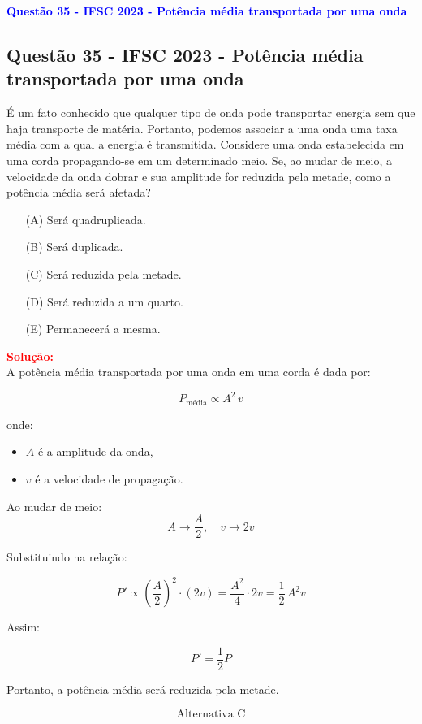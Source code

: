 \begin{flushleft}
\textbf{\textcolor{blue}{\Large Quest\~ao 35 - IFSC 2023 - Potência média transportada por uma onda}}\\
\noindent

\subsection{Quest\~ao 35 - IFSC 2023 - Potência média transportada por uma onda}
É um fato conhecido que qualquer tipo de onda pode transportar energia sem que haja transporte de matéria. 
Portanto, podemos associar a uma onda uma taxa média com a qual a energia é transmitida. Considere uma onda 
estabelecida em uma corda propagando-se em um determinado meio. Se, ao mudar de meio, a velocidade da onda dobrar 
e sua amplitude for reduzida pela metade, como a potência média será afetada?

\begin{itemize}
\item[(A)] Será quadruplicada.
\item[(B)] Será duplicada.
\item[(C)] Será reduzida pela metade.
\item[(D)] Será reduzida a um quarto.
\item[(E)] Permanecerá a mesma.
\end{itemize}

\vspace{0.5cm}

\textcolor{red}{\textbf{Solução:}}\\

A potência média transportada por uma onda em uma corda é dada por:

\[
P_{\text{média}} \propto A^2 \, v
\]

onde:
\begin{itemize}
    \item \(A\) é a amplitude da onda,
    \item \(v\) é a velocidade de propagação.
\end{itemize}

Ao mudar de meio:
\[
A \to \frac{A}{2}, \quad v \to 2v
\]

Substituindo na relação:

\[
P' \propto \left(\frac{A}{2}\right)^2 \cdot (2v) = \frac{A^2}{4} \cdot 2v = \frac{1}{2} \, A^2 v
\]

Assim:

\[
P' = \frac{1}{2} P
\]

Portanto, a potência média será reduzida pela metade.

\[
\boxed{\text{Alternativa C}}
\]

\end{flushleft}

